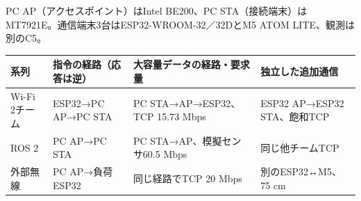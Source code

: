 \documentclass[a4paper,twocolumn,10pt]{ltjsarticle}
\begin{document}
\begin{center}\small
PC AP（アクセスポイント）はIntel BE200、PC STA（接続端末）はMT7921E。通信端末3台はESP32-WROOM-32／32DとM5 ATOM LITE、観測は別のC5。
\begin{tabularx}{\textwidth}{@{}lXXX@{}}\toprule
系列 & 指令の経路（応答は逆） & 大容量データの経路・要求量 & 独立した追加通信\\\midrule
Wi-Fi 2チーム & ESP32→PC AP→PC STA & PC STA→AP→ESP32、TCP 15.73 Mbps & ESP32 AP→ESP32 STA、飽和TCP\\
ROS 2 & PC AP→PC STA & PC STA→AP、模擬センサ60.5 Mbps & 同じ他チームTCP\\
外部無線 & PC AP→負荷ESP32 & 同じ経路でTCP 20 Mbps & 別のESP32↔M5、75 cm\\\bottomrule
\end{tabularx}\end{center}
\end{document}
